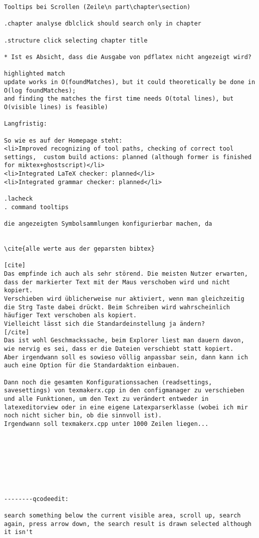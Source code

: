 \documentclass[10pt,a4paper,landscape]{report}
\begin{document}
\begin{verbatim}
Tooltips bei Scrollen (Zeile\n part\chapter\section)

.chapter analyse dblclick should search only in chapter 

.structure click selecting chapter title

* Ist es Absicht, dass die Ausgabe von pdflatex nicht angezeigt wird?

highlighted match
update works in O(foundMatches), but it could theoretically be done in O(log foundMatches);
and finding the matches the first time needs O(total lines), but O(visible lines) is feasible)

Langfristig:

So wie es auf der Homepage steht:
<li>Improved recognizing of tool paths, checking of correct tool settings,  custom build actions: planned (although former is finished for miktex+ghostscript)</li>
<li>Integrated LaTeX checker: planned</li>
<li>Integrated grammar checker: planned</li>

.lacheck
. command tooltips

die angezeigten Symbolsammlungen konfigurierbar machen, da


\cite{alle werte aus der geparsten bibtex}

[cite]
Das empfinde ich auch als sehr störend. Die meisten Nutzer erwarten, dass der markierter Text mit der Maus verschoben wird und nicht kopiert.
Verschieben wird üblicherweise nur aktiviert, wenn man gleichzeitig die Strg Taste dabei drückt. Beim Schreiben wird wahrscheinlich häufiger Text verschoben als kopiert.
Vielleicht lässt sich die Standardeinstellung ja ändern? 
[/cite]
Das ist wohl Geschmackssache, beim Explorer liest man dauern davon, wie nervig es sei, dass er die Dateien verschiebt statt kopiert.
Aber irgendwann soll es sowieso völlig anpassbar sein, dann kann ich auch eine Option für die Standardaktion einbauen.

Dann noch die gesamten Konfigurationssachen (readsettings, savesettings) von texmakerx.cpp in den configmanager zu verschieben und alle Funktionen, um den Text zu verändert entweder in latexeditorview oder in eine eigene Latexparserklasse (wobei ich mir noch nicht sicher bin, ob die sinnvoll ist).
Irgendwann soll texmakerx.cpp unter 1000 Zeilen liegen...








--------qcodeedit:

search something below the current visible area, scroll up, search again, press arrow down, the search result is drawn selected although it isn't

\end{verbatim}
\end{document}
